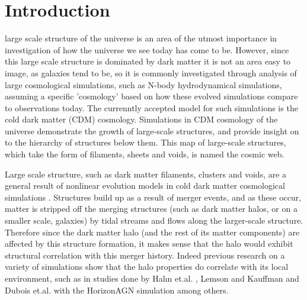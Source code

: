 \documentclass[journal]{IEEEtran}
\begin{document}
\section{Introduction}
 large scale structure of the universe is an area of the utmost importance in investigation of how the universe we see today has come to be. However, since this large scale structure is dominated by dark matter \cite{lemson99} it is not an area easy to image, as galaxies tend to be, so it is commonly investigated through analysis of large cosmological simulations, such as N-body hydrodynamical simulations, assuming a specific 'cosmology' based on how these evolved simulations compare to observations today. The currenntly accepted model for such simulations is the cold dark matter (CDM) cosmology. Simulations in CDM cosmology of the universe demonstrate the growth of large-scale structures, and provide insight on to the hierarchy of structures below them. This map of large-scale structures, which take the form of filaments, sheets and voids, is named the cosmic web.

Large scale structure, such as dark matter filaments, clusters and voids, are a general result of nonlinear evolution models in cold dark matter cosmological simulations \cite{davis85}. Structures build up as a result of merger events, and as these occur, matter is stripped off the merging structures (such as dark matter halos, or on a smaller scale, galaxies) by tidal streams and flows along the larger-scale structure. Therefore since the dark matter halo (and the rest of its matter components) are affected by this structure formation, it makes sense that the halo would exhibit structural correlation with this merger history. Indeed previous research on a variety of simulations show that the halo properties do correlate with its local environment, such as in studies done by Hahn et.al. \cite{hahn07a} \cite{hahn07b}, Lemson and Kauffman \cite{lemson99}and Dubois et.al. with the HorizonAGN simulation \cite{dubois14} among others. 
\end{document}

